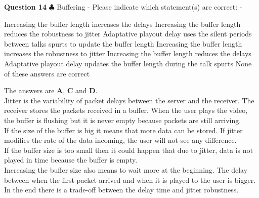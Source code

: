 \documentclass[en]{sourcefiles/eplexam}
\newcounter{choice}
\renewcommand\thechoice{\textbf{\Alph{choice}}}
\newcommand\choicelabel{\thechoice$\quad$}
\newenvironment{choices}%
  {\list{\choicelabel}%
     {\usecounter{choice}\def\makelabel##1{\hss\llap{##1}}%
       \settowidth{\leftmargin}{W.\hskip\labelsep\hskip 2.5em}%
       \def\choice{%
         \item
       } %
       \labelwidth\leftmargin\advance\labelwidth-\labelsep
       \topsep=0pt
       \partopsep=0pt
     }%
  }%
  {\endlist}
\begin{document}
\textbf{Question 14} $\clubsuit$ Buffering - Please indicate which statement(s) are correct:
\begin{choices}
     \choice Increasing the buffer length increases the delays
     \choice Increasing the buffer length reduces the robustness to jitter
     \choice Adaptative playout delay uses the silent periods between talks spurts to update the buffer length
     \choice Increasing the buffer length increases the robustness to jitter
     \choice Increasing the buffer length reduces the delays
     \choice Adaptative playout delay updates the buffer length during the talk spurts
    \choice None of these answers are correct
\end{choices}
\begin{solution}
The answers are \textbf{A}, \textbf{C} and \textbf{D}.\\


\noindent Jitter is the variability of packet delays between the server and the receiver. The receiver stores the packets received in a buffer. When the user plays the video, the buffer is flushing but it is never empty because packets are still arriving. \\
\noindent If the size of the buffer is big it means that more data can be stored. If jitter modifies the rate of the data incoming, the user will not see any difference. \\
\noindent If the buffer size is too small then it could happen that due to jitter, data is not played in time because the buffer is empty.\\ 
\noindent Increasing the buffer size also means to wait more at the beginning. The delay between when the first packet arrived and when it is played to the user is bigger. In the end there is a trade-off between the delay time and jitter robustness.

\end{solution}
\end{document}
